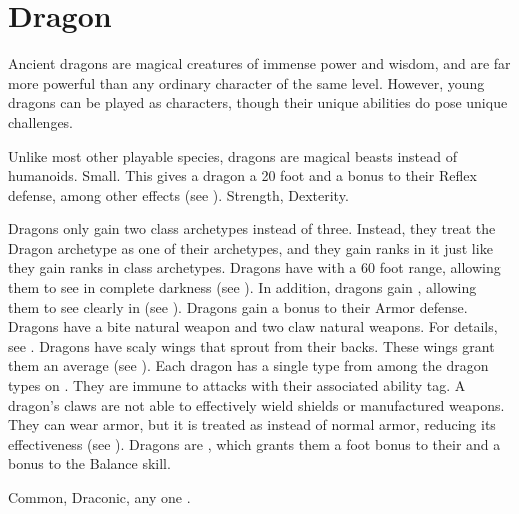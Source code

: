 \section{Dragon}
  Ancient dragons are magical creatures of immense power and wisdom, and are far more powerful than any ordinary character of the same level.
  However, young dragons can be played as characters, though their unique abilities do pose unique challenges.

   Unlike most other playable species, dragons are magical beasts instead of humanoids.
   Small. This gives a dragon a 20 foot  and a  bonus to their Reflex defense, among other effects (see ).
    Strength,  Dexterity.
  \begin{itemize}
     Dragons only gain two class archetypes instead of three.
      Instead, they treat the Dragon archetype as one of their archetypes, and they gain ranks in it just like they gain ranks in class archetypes.
     Dragons have  with a 60 foot range, allowing them to see in complete darkness (see ).
      In addition, dragons gain , allowing them to see clearly in  (see ).
     Dragons gain a  bonus to their Armor defense.
     Dragons have a bite natural weapon and two claw natural weapons.
      For details, see .
     Dragons have scaly wings that sprout from their backs.
      These wings grant them an average  (see ).
     Each dragon has a single type from among the dragon types on .
      They are immune to attacks with their associated ability tag.
     A dragon's claws are not able to effectively wield shields or manufactured weapons.
      They can wear armor, but it is treated as  instead of normal armor, reducing its effectiveness (see ).
     Dragons are , which grants them a  foot bonus to their  and a  bonus to the Balance skill.
  \end{itemize}
   Common, Draconic, any one .

